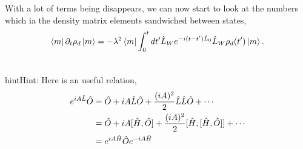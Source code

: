 \documentclass[letterpaper,10pt,english]{sphinxmanual}
\newcommand{\bra}[1]{\left\langle #1\right|}
\newcommand{\ket}[1]{\left| #1\right\rangle}
\begin{document}
With a lot of terms being disappears, we can now start to look at the numbers which ia the density matrix elements sandwiched between states,
\begin{gather}
\begin{split}\bra{m} \partial_t \rho_d \ket{m} = -\lambda^2 \bra{m} \int_0^t dt' \hat L_W e^{-i(t-t')\hat L_0} \hat L_W \rho_d(t') \ket{m}.\end{split}\notag\\\begin{split}\end{split}\notag
\end{gather}
\begin{notice}{hint}{Hint:}
Here is an useful relation,
\begin{gather}
\begin{split}e^{iA\hat L} \hat O & = \hat O + i A \hat L \hat O + \frac{(iA)^2}{2} \hat L \hat L \hat O + \cdots \\
& = \hat O + iA[\hat H, \hat O] + \frac{(iA)^2}{2}  [\hat H, [\hat H,\hat O]] + \cdots \\
& = e^{iA\hat H}\hat O e^{-iA\hat H}\end{split}\notag\\\begin{split}\end{split}\notag
\end{gather}\end{notice}
\end{document}
